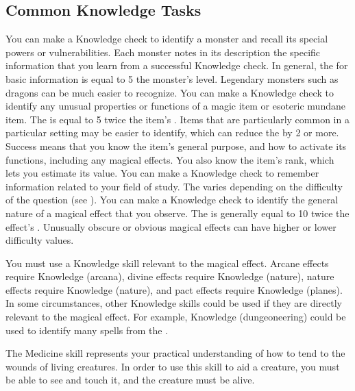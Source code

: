   \subsection{Common Knowledge Tasks}
     You can make a Knowledge check to identify a monster and recall its special powers or vulnerabilities.
    Each monster notes in its description the specific information that you learn from a successful Knowledge check.
    In general, the  for basic information is equal to 5 \add the monster's level.
    Legendary monsters such as dragons can be much easier to recognize.
     You can make a Knowledge check to identify any unusual properties or functions of a magic item or esoteric mundane item.
    The  is equal to 5 \add twice the item's .
    Items that are particularly common in a particular setting may be easier to identify, which can reduce the  by 2 or more.
    Success means that you know the item's general purpose, and how to activate its functions, including any magical effects.
    You also know the item's rank, which lets you estimate its value.
     You can make a Knowledge check to remember information related to your field of study.
    The  varies depending on the difficulty of the question (see ).
     You can make a Knowledge check to identify the general nature of a magical effect that you observe.
    The  is generally equal to 10 \add twice the effect's .
    Unusually obscure or obvious magical effects can have higher or lower difficulty values.

    You must use a Knowledge skill relevant to the magical effect.
    Arcane effects require Knowledge (arcana), divine effects require Knowledge (nature), nature effects require Knowledge (nature), and pact effects require Knowledge (planes).
    In some circumstances, other Knowledge skills could be used if they are directly relevant to the magical effect.
    For example, Knowledge (dungeoneering) could be used to identify many spells from the  .

\newpage
{}
  The Medicine skill represents your practical understanding of how to tend to the wounds of living creatures.
  In order to use this skill to aid a creature, you must be able to see and touch it, and the creature must be alive.

